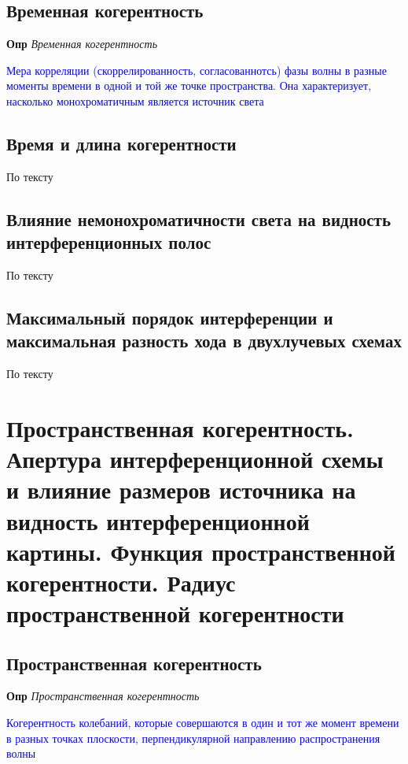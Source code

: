 \documentclass[a4paper, 14pt]{article}
\begin{document}
    \subsection{Временная когерентность}
    
    \textbf{Опр} \textit{Временная когерентность}
    
    \textcolor{blue}{Мера корреляции (скоррелированность, согласованнотсь) фазы волны в разные моменты времени в одной и
    той же точке пространства.
    Она характеризует, насколько монохроматичным является источник света}
    
    \subsection{Время и длина когерентности}
    
    По тексту
    
    \subsection{Влияние немонохроматичности света на видность интерференционных полос}
    
    По тексту
    
    \subsection{Максимальный порядок интерференции и максимальная разность хода в двухлучевых схемах}
    
    По тексту
    
    \section{Пространственная когерентность.
    Апертура интерференционной схемы и влияние размеров источника на видность интерференционной картины.
    Функция пространственной когерентности.
    Радиус пространственной когерентности}
    
    \subsection{Пространственная когерентность}
    
    \textbf{Опр} \textit{Пространственная когерентность}
    
    \textcolor{blue}{Когерентность колебаний, которые совершаются в один и тот же момент времени в разных точках
    плоскости, перпендикулярной направлению распространения волны}
    
\end{document}
